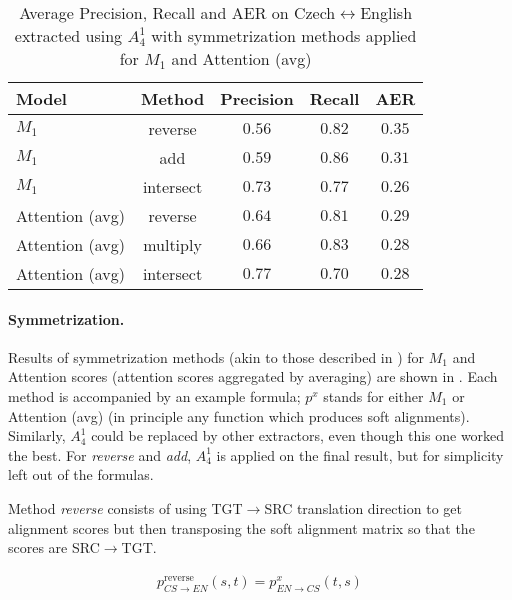 \begin{table}[h!]
    \vspace{0.5cm}
    \center
    \begin{tabular}{lcccc}
        \toprule
        Model & Method & Precision & Recall & AER \\
        \midrule
        $M_1$ & reverse & $0.56$ & $0.82$ & $0.35$ \\
        $M_1$ & add & $0.59$ & $0.86$ & $0.31$ \\
        $M_1$ & intersect & $0.73$ & $0.77$ & $0.26$ \\
        \midrule
        Attention (avg) & reverse & $0.64$ & $0.81$ & $0.29$ \\
        Attention (avg) & multiply & $0.66$ & $0.83$ & $0.28$ \\
        Attention (avg) & intersect & $0.77$ & $0.70$ & $0.28$ \\
        \bottomrule
    \end{tabular}
    \caption{Average Precision, Recall and AER on Czech$\leftrightarrow$English extracted using $A_4^1$ with symmetrization methods applied for $M_1$ and Attention (avg)\label{tab:individual_symmetry}}
\end{table}

\paragraph{Symmetrization.} Results of symmetrization methods (akin to those described in ) for $M_1$ and Attention scores (attention scores aggregated by averaging) are shown in . Each method is accompanied by an example formula; $p^x$ stands for either $M_1$ or Attention (avg) (in principle any function which produces soft alignments). Similarly, $A_4^1$ could be replaced by other extractors, even though this one worked the best. For \textit{reverse} and \textit{add}, $A_4^1$ is applied on the final result, but for simplicity left out of the formulas.

Method \textit{reverse} consists of using TGT$\rightarrow$SRC translation direction to get alignment scores but then transposing the soft alignment matrix so that the scores are SRC$\rightarrow$TGT.

\vspace*{-0.3cm}
\begin{gather*}
    p_{CS\rightarrow EN}^\text{reverse}(s, t) = p^x_{EN\rightarrow CS}(t, s)
\end{gather*}
\vspace*{0.0cm}

